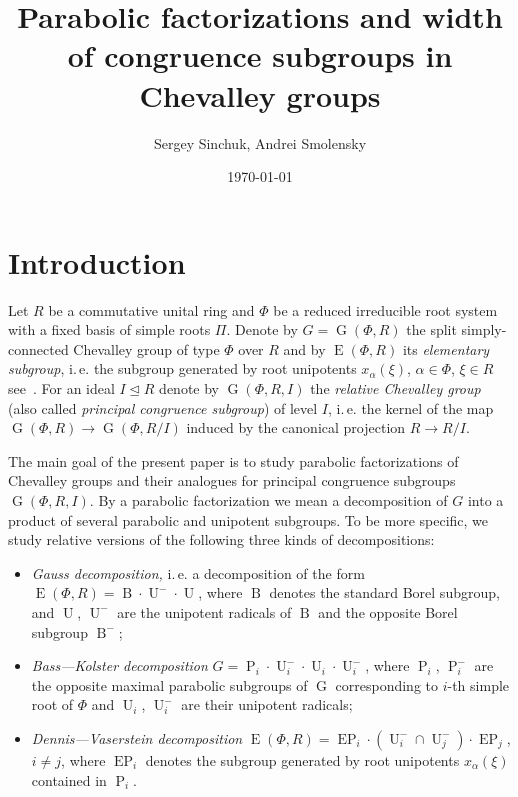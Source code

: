 \documentclass[12pt]{amsart}
\title [Parabolic factorizations of congruence subgroups] {Parabolic factorizations and width of congruence subgroups in Chevalley groups}
\author {Sergey Sinchuk, Andrei Smolensky}
\date {\today}
\numberwithin{equation}{section}
\theoremstyle{definition}
\DeclareMathOperator{\G}{G}
\DeclareMathOperator{\E}{E}
\DeclareMathOperator{\EP}{EP}
\DeclareMathOperator{\Par}{P}
\DeclareMathOperator{\B}{B}
\DeclareMathOperator{\U}{U}
\begin{document}

\maketitle

\section{Introduction}\label{sec:intro}
Let $R$ be a commutative unital ring and $\Phi$ be a reduced irreducible root system with a fixed basis of simple roots $\Pi$.
Denote by $G=\G(\Phi, R)$ the split simply-connected Chevalley group of type $\Phi$ over $R$ and by $\E(\Phi, R)$ its \emph{elementary subgroup}, 
i.\,e. the subgroup generated by root unipotents $x_\alpha(\xi)$, $\alpha\in\Phi$, $\xi\in R$ see~\cite{VP, St78, S}.
For an ideal $I \trianglelefteq R$ denote by $\G(\Phi, R, I)$ the \emph{relative Chevalley group} (also called \emph{principal congruence subgroup}) of level $I$, 
i.\,e. the kernel of the map $\G(\Phi, R)\rightarrow\G(\Phi, R/I)$ induced by the canonical projection $R\rightarrow R/I$.

The main goal of the present paper is to study parabolic factorizations of Chevalley groups and their analogues for principal congruence subgroups $\G(\Phi, R, I)$.
By a parabolic factorization we mean a decomposition of $G$ into a product of several parabolic and unipotent subgroups.
To be more specific, we study relative versions of the following three kinds of decompositions:
\begin{itemize}
\item \emph{Gauss decomposition,} i.\,e. a decomposition of the form $\E(\Phi,R)=\B \cdot \U^- \cdot \U$, where $\B$ denotes the standard Borel subgroup,
      and $\U$, $\U^-$ are the unipotent radicals of $\B$ and the opposite Borel subgroup $\B^-$;
\item \emph{Bass---Kolster decomposition} $G = \Par_i \cdot \U_i^- \cdot \U_i \cdot \U_i^-$, where 
      $\Par_i$, $\Par_i^-$ are the opposite maximal parabolic subgroups of $\G$ corresponding to $i$-th simple root of $\Phi$ and $\U_i$, $\U_i^-$ are their unipotent radicals;
\item \emph{Dennis---Vaserstein decomposition} $\E(\Phi, R) = \EP_i \cdot (\U_i^- \cap \U_j^-) \cdot \EP_j$, $i\neq j$,
      where $\EP_i$ denotes the subgroup generated by root unipotents $x_\alpha(\xi)$ contained in $\Par_i$.
\end{itemize}
\end{document}

